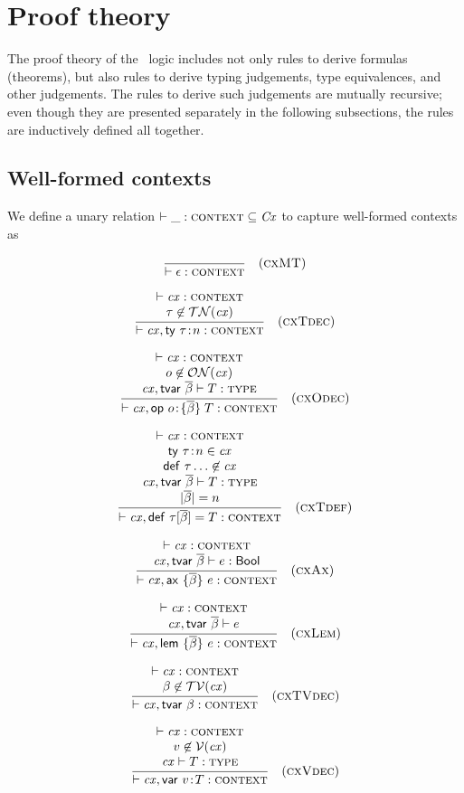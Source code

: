 \section{Proof theory}
\label{proofth}

The proof theory of the \MS\ logic includes not only rules to derive formulas
(theorems), but also rules to derive typing judgements, type equivalences, and
other judgements. The rules to derive such judgements are mutually recursive;
even though they are presented separately in the following subsections, the
rules are inductively defined all together.

\subsection{Well-formed contexts}
\label{wfcx-rules}

We define a unary relation $\unarel{\cxwfY}{\Cx}$ to capture well-formed
contexts as

\[
\rruleO
 {\cxwf{\mtcx}}
 {\Rcxmt}
\]

\[
\rruleII
 {\cxwfO}
 {\tnam\not\in\cxtnam{\cx}}
 {\cxwf{\snoc{\cx}{\tdecO}}}
 {\Rcxtdec}
\]

\[
\rruleIII
 {\cxwfO}
 {\onam\not\in\cxonam{\cx}}
 {\isty{\snoc{\cx}{\tvdec{\tvarS}}}{\typ}}
 {\cxwf{\snoc{\cx}{\odecO}}}
 {\Rcxodec}
\]

\[
\rruleV
 {\cxwfO}
 {\tdecO\in\cx}
 {\tdefdots{\tnam}\not\in\cx}
 {\isty{\snoc{\cx}{\tvdec{\tvarS}}}{\typ}}
 {\seqlen{\tvarS}=n}
 {\cxwf{\snoc{\cx}{\tdefO}}}
 {\Rcxtdef}
\]


\[
\rruleII
 {\cxwfO}
 {\hasty{\snoc{\cx}{\tvdec{\tvarS}}}{\expr}{\bool}}
 {\cxwf{\snoc{\cx}{\axO}}}
 {\Rcxax}
\]

\[
\rruleII
 {\cxwfO}
 {\theo{\snoc{\cx}{\tvdec{\tvarS}}}{\expr}}
 {\cxwf{\snoc{\cx}{\lemO}}}
 {\Rcxlem}
\]

\[
\rruleII
 {\cxwfO}
 {\tvar\not\in\cxtvar{\cx}}
 {\cxwf{\snoc{\cx}{\tvdecO}}}
 {\Rcxtvdec}
\]

\[
\rruleIII
 {\cxwfO}
 {\var\not\in\cxvar{\cx}}
 {\isty{\cx}{\typ}}
 {\cxwf{\snoc{\cx}{\vdecO}}}
 {\Rcxvdec}
\]

